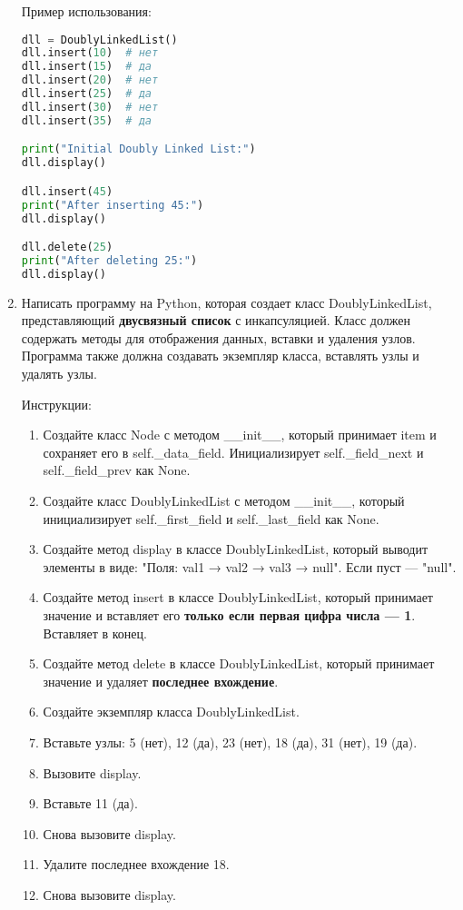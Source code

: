 \begin{enumerate}
Пример использования:
\begin{lstlisting}[language=Python]
dll = DoublyLinkedList()
dll.insert(10)  # нет
dll.insert(15)  # да
dll.insert(20)  # нет
dll.insert(25)  # да
dll.insert(30)  # нет
dll.insert(35)  # да

print("Initial Doubly Linked List:")
dll.display()

dll.insert(45)
print("After inserting 45:")
dll.display()

dll.delete(25)
print("After deleting 25:")
dll.display()
\end{lstlisting}

\item Написать программу на Python, которая создает класс DoublyLinkedList, представляющий \textbf{двусвязный список} с инкапсуляцией. Класс должен содержать методы для отображения данных, вставки и удаления узлов. Программа также должна создавать экземпляр класса, вставлять узлы и удалять узлы.

Инструкции:
\begin{enumerate}
    \item Создайте класс Node с методом \_\_init\_\_, который принимает item и сохраняет его в self.\_data\_field. Инициализирует self.\_field\_next и self.\_field\_prev как None.
    \item Создайте класс DoublyLinkedList с методом \_\_init\_\_, который инициализирует self.\_first\_field и self.\_last\_field как None.
    \item Создайте метод display в классе DoublyLinkedList, который выводит элементы в виде: "Поля: val1 → val2 → val3 → null". Если пуст — "null".
    \item Создайте метод insert в классе DoublyLinkedList, который принимает значение и вставляет его \textbf{только если первая цифра числа — 1}. Вставляет в конец.
    \item Создайте метод delete в классе DoublyLinkedList, который принимает значение и удаляет \textbf{последнее вхождение}.
    \item Создайте экземпляр класса DoublyLinkedList.
    \item Вставьте узлы: 5 (нет), 12 (да), 23 (нет), 18 (да), 31 (нет), 19 (да).
    \item Вызовите display.
    \item Вставьте 11 (да).
    \item Снова вызовите display.
    \item Удалите последнее вхождение 18.
    \item Снова вызовите display.
\end{enumerate}


\end{enumerate}
